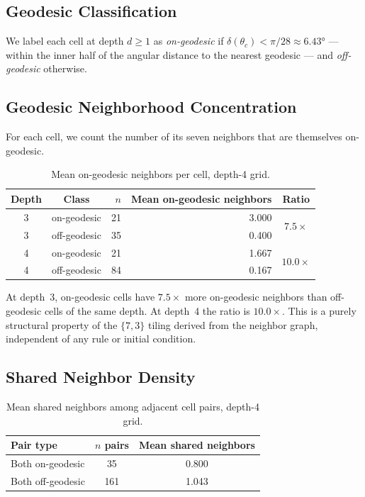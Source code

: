 \documentclass[12pt,a4paper]{article}
\begin{document}
\subsection{Geodesic Classification}

We label each cell at depth $d\geq 1$ as \emph{on-geodesic} if $\delta(\theta_c)<\pi/28\approx6.43°$ --- within the inner half of the angular distance to the nearest geodesic --- and \emph{off-geodesic} otherwise.

\subsection{Geodesic Neighborhood Concentration}

For each cell, we count the number of its seven neighbors that are themselves on-geodesic.

\begin{table}[h]
\centering
\caption{Mean on-geodesic neighbors per cell, depth-4 grid.}
\label{tab:concentration}
\begin{tabular}{ccrrc}
\toprule
Depth & Class & $n$ & Mean on-geodesic neighbors & Ratio \\
\midrule
3 & on-geodesic  & 21 & 3.000 & \multirow{2}{*}{$7.5\times$} \\
3 & off-geodesic & 35 & 0.400 & \\[4pt]
4 & on-geodesic  & 21 & 1.667 & \multirow{2}{*}{$10.0\times$} \\
4 & off-geodesic & 84 & 0.167 & \\
\bottomrule
\end{tabular}
\end{table}

At depth~3, on-geodesic cells have $7.5\times$ more on-geodesic neighbors than off-geodesic cells of the same depth. At depth~4 the ratio is $10.0\times$. This is a purely structural property of the $\{7,3\}$ tiling derived from the neighbor graph, independent of any rule or initial condition.

\subsection{Shared Neighbor Density}

\begin{table}[h]
\centering
\caption{Mean shared neighbors among adjacent cell pairs, depth-4 grid.}
\label{tab:shared}
\begin{tabular}{lcc}
\toprule
Pair type & $n$ pairs & Mean shared neighbors \\
\midrule
Both on-geodesic  & 35  & 0.800 \\
Both off-geodesic & 161 & 1.043 \\
\bottomrule
\end{tabular}
\end{table}
\end{document}
